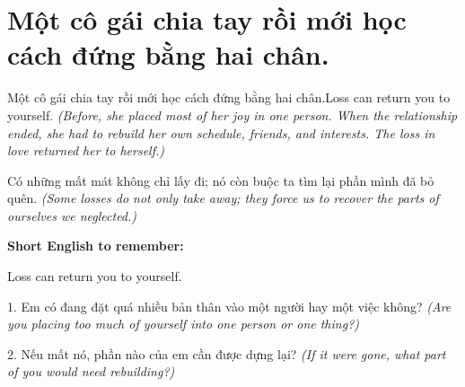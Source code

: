\section{Một cô gái chia tay rồi mới học cách đứng bằng hai chân.}
\begin{truyen}{Một cô gái chia tay rồi mới học cách đứng bằng hai chân.}{Loss can return you to yourself.}
\textit{(Before, she placed most of her joy in one person. When the relationship ended, she had to rebuild her own schedule, friends, and interests. The loss in love returned her to herself.)}
\end{truyen}
\begin{baihoc}
Có những mất mát không chỉ lấy đi; nó còn buộc ta tìm lại phần mình đã bỏ quên.
\textit{(Some losses do not only take away; they force us to recover the parts of ourselves we neglected.)}
\end{baihoc}
\begin{ghinhoanh}\textbf{Short English to remember:}

Loss can return you to yourself.
\end{ghinhoanh}
\begin{tuhocnhanh}
1. Em có đang đặt quá nhiều bản thân vào một người hay một việc không? \textit{(Are you placing too much of yourself into one person or one thing?)}

2. Nếu mất nó, phần nào của em cần được dựng lại? \textit{(If it were gone, what part of you would need rebuilding?)}
\end{tuhocnhanh}
\ngancach

